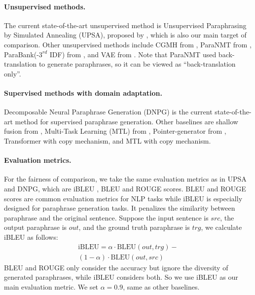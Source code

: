 \paragraph{Unsupervised methods. } The current state-of-the-art unsupervised method is Unsupervised Paraphrasing by Simulated Annealing (UPSA), proposed by \citet{liu2019unsupervised}, which is also our main target of comparison. Other unsupervised methods include CGMH from \citet{miao2019cgmh}, ParaNMT from \citet{wieting2017paranmt}, ParaBank(-$3^{rd}$ IDF) from \citet{hu2019parabank}, and VAE from \citet{kingma2013auto}. Note that ParaNMT used back-translation to generate paraphrases, so it can be viewed as ``back-translation only''.

\paragraph{Supervised methods with domain adaptation. } Decomposable Neural Paraphrase Generation (DNPG) \citep{li2019decomposable} is the current state-of-the-art method for supervised paraphrase generation.
Other baselines are shallow fusion from \citet{gulcehre2015using}, Multi-Task Learning (MTL) from \citet{domhan2017using}, Pointer-generator from \citet{see2017get}, Transformer \citep{vaswani2017attention} with copy mechanism, and MTL with copy mechanism. 

\paragraph{Evaluation metrics. } For the fairness of comparison, 
we take the same evaluation metrics as in UPSA and 
DNPG, which are iBLEU \citep{sun2012joint}, BLEU \citep{papineni2002bleu} and ROUGE \citep{lin2004rouge} scores. 
BLEU and ROUGE scores are common evaluation metrics for NLP tasks while 
iBLEU is especially designed for paraphrase generation tasks. 
It penalizes the similarity between paraphrase and the original sentence. 
Suppose the input sentence is $src$, the output paraphrase is $out$, 
and the ground truth paraphrase is $trg$, we calculate iBLEU as follows:
\begin{multline}
\text{iBLEU} = \alpha \cdot \text{BLEU}(out, trg) - \\
(1-\alpha) \cdot \text{BLEU}(out, src)
\end{multline}
BLEU and ROUGE only consider the accuracy but ignore the 
diversity of generated paraphrases, while iBLEU considers both. 
So we use iBLEU as our main evaluation metric.
We set $\alpha=0.9$, same as other baselines.

